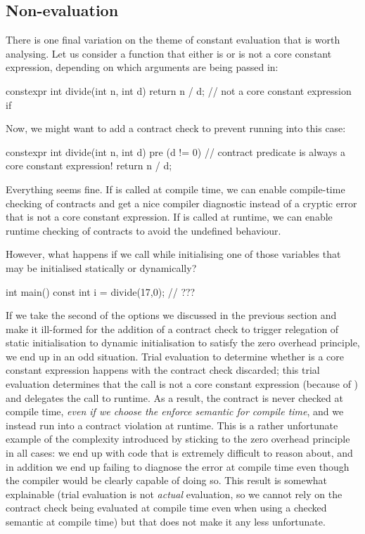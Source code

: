 
\subsection{Non-evaluation}

There is one final variation on the theme of constant evaluation that is worth analysing. Let us consider a  function that either is or is not a core constant expression, depending on which arguments are being passed in:

\begin{codeblock}
constexpr int divide(int n, int d) {
  return n / d;   // not a core constant expression if 
}
\end{codeblock}

Now, we might want to add a contract check to prevent running into this case:

\begin{codeblock}
constexpr int divide(int n, int d)
  pre (d != 0) {  // contract predicate is always a core constant expression!
  return n / d; 
}
\end{codeblock}

Everything seems fine. If  is called at compile time, we can enable compile-time checking of contracts and get a nice compiler diagnostic instead of a cryptic error that  is not a core constant expression. If  is called at runtime, we can enable runtime checking of contracts to avoid the undefined behaviour.

However, what happens if we call  while initialising one of those variables that may be initialised statically or dynamically?

\begin{codeblock}
int main() {
  const int i = divide(17,0);   // ???
}
\end{codeblock}

If we take the second of the options we discussed in the previous section and make it ill-formed for the addition of a contract check to trigger relegation of static initialisation to dynamic initialisation to satisfy the zero overhead principle, we end up in an odd situation. Trial evaluation to determine whether  is a core constant expression happens with the contract check discarded; this trial evaluation determines that the call is not a core constant expression (because of ) and delegates the call to runtime. As a result, the contract is never checked at compile time, \emph{even if we choose the enforce semantic for compile time}, and we instead run into a contract violation at runtime. This is a rather unfortunate example of the complexity introduced by sticking to the zero overhead principle in all cases: we end up with code that is extremely difficult to reason about, and in addition we end up failing to diagnose the error at compile time even though the compiler would be clearly capable of doing so. This result is somewhat explainable (trial evaluation is not \emph{actual} evaluation, so we cannot rely on the contract check being evaluated at compile time even when using a checked semantic at compile time) but that does not make it any less unfortunate.

